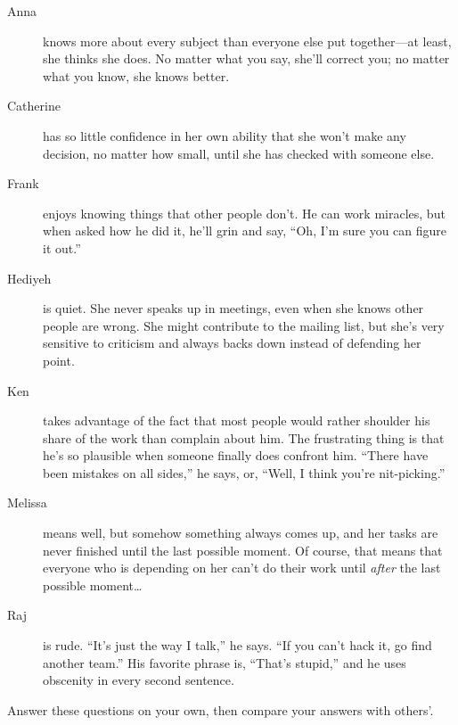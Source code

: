 \begin{description}

\item[Anna]
  knows more about every subject than everyone else put together---at least,
  she thinks she does.
  No matter what you say,
  she'll correct you;
  no matter what you know, she knows better.

\item[Catherine]
  has so little confidence in her own ability
  that she won't make any decision,
  no matter how small,
  until she has checked with someone else.

\item[Frank]
  enjoys knowing things that other people don't.
  He can work miracles,
  but when asked how he did it,
  he'll grin and say,
  ``Oh, I'm sure you can figure it out.''

\item[Hediyeh]
  is quiet.
  She never speaks up in meetings,
  even when she knows other people are wrong.
  She might contribute to the mailing list,
  but she's very sensitive to criticism
  and always backs down instead of defending her point.

\item[Ken]
  takes advantage of the fact that most people would rather shoulder his share of the work
  than complain about him.
  The frustrating thing is that he's so plausible when someone finally does confront him.
  ``There have been mistakes on all sides,''
  he says,
  or, ``Well, I think you're nit-picking.''

\item[Melissa]
  means well,
  but somehow something always comes up,
  and her tasks are never finished until the last possible moment.
  Of course,
  that means that everyone who is depending on her can't do their work
  until \emph{after} the last possible moment{\ldots}

\item[Raj]
  is rude.
  ``It's just the way I talk,'' he says.
  ``If you can't hack it, go find another team.''
  His favorite phrase is, ``That's stupid,''
  and he uses obscenity in every second sentence.

\end{description}


Answer these questions on your own,
then compare your answers with others'.

